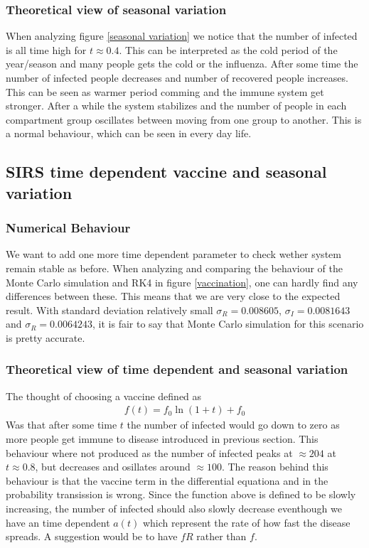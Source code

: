 \documentclass[a4paper, 10pt]{article}
\begin{document}
\subsubsection{Theoretical view of seasonal variation}  When analyzing figure \eqref{seasonal variation} we notice that the number of infected is all time high for $t \approx 0.4$.
This can be interpreted as the cold period of the year/season and many people gets the cold or the influenza.
After some time the number of infected people decreases and number of recovered people increases.
This can be seen as warmer period comming and the immune system get stronger. After a while the system stabilizes
and the number of people in each compartment group oscillates between moving from one group to another.
This is a normal behaviour, which can be seen in every day life.

\subsection{SIRS time dependent vaccine and seasonal variation}
\subsubsection{Numerical Behaviour} We want to add one more time dependent parameter to check wether system remain stable as before.
When  analyzing and comparing the behaviour of the Monte Carlo simulation and RK4 in figure \eqref{vaccination},
one can hardly find any differences between these. This means that we are very close to the expected result.
With standard deviation relatively small $\sigma_{R} =  0.008605$, $\sigma_{I} = 0.0081643 $ and $\sigma_{R} = 0.0064243$, it
is fair to say that Monte Carlo simulation for this scenario is pretty accurate.
\subsubsection{Theoretical view of time dependent and seasonal variation} The thought of choosing a
vaccine defined as
\begin{align}
  f(t) = f_{0}\ln{(1+t)} + f_{0}
\end{align}
Was that after some time $t$ the number of infected would go down to zero as more people get immune to disease introduced in previous section.
This behaviour where not produced as the number of infected peaks at $\approx 204$ at $t\approx 0.8$, but decreases and osillates around $\approx 100$.
The reason behind this behaviour is that the vaccine term in the differential equationa and in the probability transission is wrong.
Since the function above is defined to be slowly increasing, the number of infected should also slowly decrease eventhough
we have an time dependent $a(t)$ which represent the rate of how fast the disease spreads. A suggestion would be to
have $fR$ rather than $f$.
\end{document}
